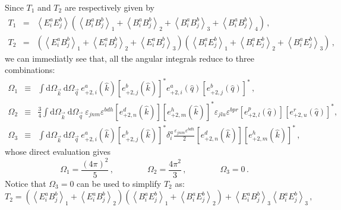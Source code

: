 Since $T_1 $ and $T_2 $ are respectively given by 
\begin{eqnarray}
  T_1 &=& \left \langle E^a_{i} E^b_{j} \right \rangle \left(  \left \langle B^a_{i} B^b_{j} \right \rangle_1 +\left \langle B^a_{i} B^b_{j} \right \rangle_2 +\left \langle B^a_{i} B^b_{j} \right \rangle_3 +\left \langle B^a_{i} B^b_{j} \right \rangle_4 \right) \, , \\ 
  T_2 &=& \left( \left \langle E^a_{i} B^b_{j} \right \rangle_1 +\left \langle E^a_{i} B^b_{j} \right \rangle_2 +\left \langle E^a_{i} B^b_{j} \right \rangle_3 \right) \left( \left \langle B^a_{i} E^b_{j} \right \rangle_1 +\left \langle B^a_{i} E^b_{j} \right \rangle_2 +\left \langle B^a_{i} E^b_{j} \right \rangle_3 \right) \, , \hspace{1cm}
\end{eqnarray}
we can immediatly see that, all the angular integrals reduce to three combinations:
\begin{eqnarray}
  \Omega_1 &\equiv& \int \textrm{d} \Omega_{\vec{k}} \ \textrm{d} \Omega_{\vec{q}} \ e_{+2, i}^a (\hat{k}) \left[ e_{+2, j}^b (\hat{k}) \right]^*  e_{+2, i}^a (\hat{q}) \left[ e_{+2, j}^b (\hat{q}) \right]^* \, , \\
  \Omega_2 &\equiv& \frac{3}{4} \int \textrm{d} \Omega_{\vec{k}} \ \textrm{d} \Omega_{\vec{q}} \ \varepsilon_{jnm} \varepsilon^{bdh} \left[ e_{+2, n}^d (\hat{k}) \right] \left[ e_{+2, m}^h (\hat{k}) \right]^* \varepsilon_{jlu} \varepsilon^{bpr} \left[ e_{+2, l}^p (\hat{q}) \right] \left[ e_{+2, u}^r (\hat{q}) \right]^* , \hspace{1cm} \\
  \Omega_3 &\equiv& \int \textrm{d} \Omega_{\vec{k}} \ \textrm{d} \Omega_{\vec{q}} \ e_{+2, i}^a (\hat{k}) \left[ e_{+2, j}^b (\hat{k}) \right]^* \delta^a_i \frac{\varepsilon_{jnm} \varepsilon^{bdh}}{2} \left[ e_{+2, n}^d (\hat{k}) \right] \left[ e_{+2, m}^h (\hat{k}) \right]^* \, ,
\end{eqnarray}
whose direct evaluation gives
\begin{equation}
   \Omega_1 = \frac{(4\pi)^2}{5} \, ,\qquad \qquad \Omega_2 = \frac{4\pi^2}{3} \, ,\qquad \qquad \Omega_3 = 0 \, . 
\end{equation}
Notice that $\Omega_3 = 0$ can be used to simplify $T_2$ as:
\begin{equation}
  T_2 = \left( \left \langle E^a_{i} B^b_{j} \right \rangle_1 +\left \langle E^a_{i} B^b_{j} \right \rangle_2  \right) \left( \left \langle B^a_{i} E^b_{j} \right \rangle_1 +\left \langle B^a_{i} E^b_{j} \right \rangle_2 \right) +\left \langle E^a_{i} B^b_{j} \right \rangle_3 \left \langle B^a_{i} E^b_{j} \right \rangle_3 \, ,
\end{equation}
